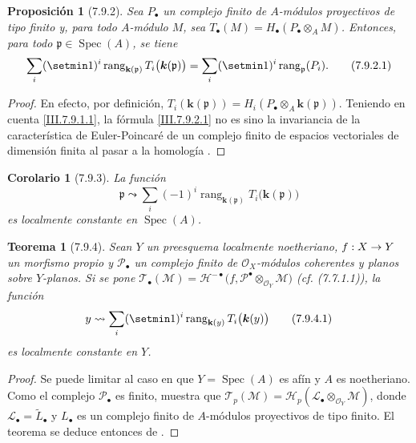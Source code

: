 \documentclass[10pt,oneside,openany]{book}
\theoremstyle{egaenv}\newtheorem*{env}{---}
\theoremstyle{egastatement}
\newtheorem*{theorem}{Teorema}
\newtheorem*{proposition}{Proposición}
\newtheorem*{corollary}{Corolario}
\theoremstyle{egadescription}
\newcommand{\oldpage}[2][]{\marginnote{\normalfont\scriptsize\textbf{#1}\,|\,#2}\ignorespaces}
\renewcommand{\to}{\mathchoice{\longrightarrow}{\rightarrow}{\rightarrow}{\rightarrow}}
\begin{document}
\begin{proposition}[7.9.2]
\label{III.7.9.2}
\label{III.7.9.2.fr}
Sea $P_\bullet$ un complejo finito de $A$-módulos proyectivos de
tipo finito y, para todo $A$-módulo $M$, sea $T_\bullet(M)=H_\bullet(P_\bullet\otimes_A M)$.
Entonces, para todo $\mathfrak p\in\operatorname{Spec}(A)$, se tiene
\[
  \sum_i(\setmin 1)^i\operatorname{rang}_{\mathbf{k}(\mathfrak p)}
  T_i\bigl(\boldsymbol{k}(\mathfrak p)\bigr)
  =\sum_i(\setmin 1)^i\operatorname{rang}_{\mathfrak p}(P_i).
  \tag{7.9.2.1}\label{III.7.9.2.1.fr}
\]
\end{proposition}

\begin{proof}
En efecto, por definición,
$T_i(\boldsymbol{k}(\mathfrak p))=H_i(P_\bullet\otimes_A\boldsymbol{k}(\mathfrak p))$.
Teniendo en cuenta \eqref{III.7.9.1.1}, la fórmula
\eqref{III.7.9.2.1} no es sino la invariancia de la característica
de Euler-Poincaré de un complejo finito de espacios vectoriales de
dimensión finita al pasar a la homología
.
\end{proof}

\begin{corollary}[7.9.3]
\label{III.7.9.3}
\label{III.7.9.3.fr}
La función
\[
  \mathfrak p\leadsto
  \sum_i(-1)^i\operatorname{rang}_{\mathbf{k}(\mathfrak p)}
  T_i\bigl(\boldsymbol{k}(\mathfrak p)\bigr)
\]
es localmente constante en $\operatorname{Spec}(A)$.
\end{corollary}

\begin{theorem}[7.9.4]
\label{III.7.9.4}
\label{III.7.9.4.fr}
Sean $Y$ un preesquema localmente noetheriano,
$f:X\to Y$ un morfismo propio y $\mathscr P_\bullet$ un complejo
finito de $\mathscr O_X$-módulos coherentes y planos sobre $Y$-planos. Si se pone
$\mathscr T_\bullet(\mathscr M)
  =\mathscr H^{-\bullet}
  \bigl(f,\mathscr P^\bullet\otimes_{\mathscr O_Y}\mathscr M\bigr)$ \textup{(cf. (7.7.1.1))},
la función
\oldpage[III]{209}
\[
  y\leadsto
  \sum_i(\setmin 1)^i\operatorname{rang}_{\mathbf{k}(y)}
  T_i\bigl(\boldsymbol{k}(y)\bigr)
  \tag{7.9.4.1}\label{III.7.9.4.1.fr}
\]
es localmente constante en $Y$.
\end{theorem}

\begin{proof}
Se puede limitar al caso en que $Y=\operatorname{Spec}(A)$ es afín y $A$ es
noetheriano. Como el complejo $\mathscr P_\bullet$ es finito,
 muestra que
$\mathscr T_p(\mathscr M)=\mathscr H_p(\mathscr L_\bullet\otimes_{\mathscr O_Y}\mathscr M)$,
donde $\mathscr L_\bullet=\widetilde{L}_\bullet$ y
$L_\bullet$ es un complejo finito de $A$-módulos proyectivos de
tipo finito. El teorema se deduce entonces de
.
\end{proof}
\end{document}
